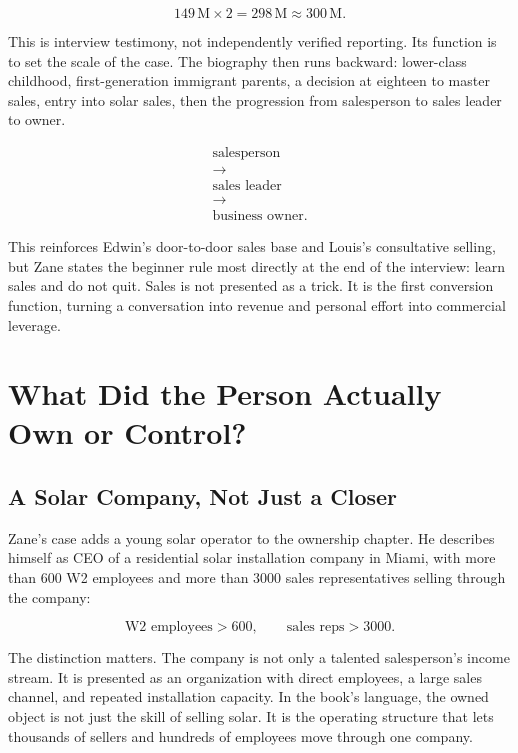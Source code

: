 \documentclass[11pt,oneside]{book}
\begin{document}
\begin{equation}
149\,\mathrm{M}\times 2=298\,\mathrm{M}\approx 300\,\mathrm{M}.
\end{equation}

This is interview testimony, not independently verified reporting. Its function is to set the scale of the case. The biography then runs backward: lower-class childhood, first-generation immigrant parents, a decision at eighteen to master sales, entry into solar sales, then the progression from salesperson to sales leader to owner.

\begin{equation}
\begin{gathered}
\text{salesperson}\\
\longrightarrow\\
\text{sales leader}\\
\longrightarrow\\
\text{business owner}.
\end{gathered}
\end{equation}

This reinforces Edwin's door-to-door sales base and Louis's consultative selling, but Zane states the beginner rule most directly at the end of the interview: learn sales and do not quit. Sales is not presented as a trick. It is the first conversion function, turning a conversation into revenue and personal effort into commercial leverage.

\chapter{What Did the Person Actually Own or Control?}

\section{A Solar Company, Not Just a Closer}

Zane's case adds a young solar operator to the ownership chapter. He describes himself as CEO of a residential solar installation company in Miami, with more than \(600\) W2 employees and more than \(3000\) sales representatives selling through the company:

\begin{equation}
\text{W2 employees}>600,
\qquad
\text{sales reps}>3000.
\end{equation}

The distinction matters. The company is not only a talented salesperson's income stream. It is presented as an organization with direct employees, a large sales channel, and repeated installation capacity. In the book's language, the owned object is not just the skill of selling solar. It is the operating structure that lets thousands of sellers and hundreds of employees move through one company.
\end{document}
